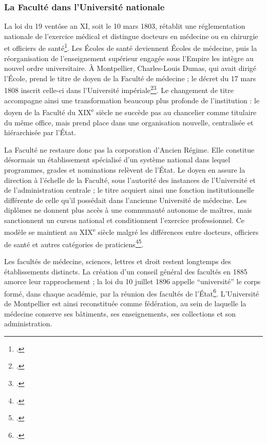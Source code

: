 \subsubsection{La Faculté dans l'Université nationale}

La loi du 19 ventôse an XI, soit le 10 mars 1803, rétablit une réglementation nationale de l'exercice médical et distingue docteurs en médecine ou en chirurgie et officiers de santé\footcite{LoiVentoseAnXI}. Les Écoles de santé deviennent Écoles de médecine, puis la réorganisation de l'enseignement supérieur engagée sous l'Empire les intègre au nouvel ordre universitaire. À Montpellier, Charles-Louis Dumas, qui avait dirigé l'École, prend le titre de doyen de la Faculté de médecine ; le décret du 17 mars 1808 inscrit celle-ci dans l'Université impériale\footcite{DecretUniversiteImperiale1808}\footcite{Condette2006Dumas}. Le changement de titre accompagne ainsi une transformation beaucoup plus profonde de l'institution : le doyen de la Faculté du XIX\textsuperscript{e} siècle ne succède pas au chancelier comme titulaire du même office, mais prend place dans une organisation nouvelle, centralisée et hiérarchisée par l'État.

La Faculté ne restaure donc pas la corporation d'Ancien Régime. Elle constitue désormais un établissement spécialisé d'un système national dans lequel programmes, grades et nominations relèvent de l'État. Le doyen en assure la direction à l'échelle de la Faculté, sous l'autorité des instances de l'Université et de l'administration centrale ; le titre acquiert ainsi une fonction institutionnelle différente de celle qu'il possédait dans l'ancienne Université de médecine. Les diplômes ne donnent plus accès à une communauté autonome de maîtres, mais sanctionnent un cursus national et conditionnent l'exercice professionnel. Ce modèle se maintient au XIX\textsuperscript{e} siècle malgré les différences entre docteurs, officiers de santé et autres catégories de praticiens\footcite{Leonard1966EtudesMedicales}\footcite{Brier2019OrganisationMedicale}.

Les facultés de médecine, sciences, lettres et droit restent longtemps des établissements distincts. La création d'un conseil général des facultés en 1885 amorce leur rapprochement ; la loi du 10 juillet 1896 appelle \enquote{université} le corps formé, dans chaque académie, par la réunion des facultés de l'État\footcite{LoiUniversites1896}. L'Université de Montpellier est ainsi reconstituée comme fédération, au sein de laquelle la médecine conserve ses bâtiments, ses enseignements, ses collections et son administration.

